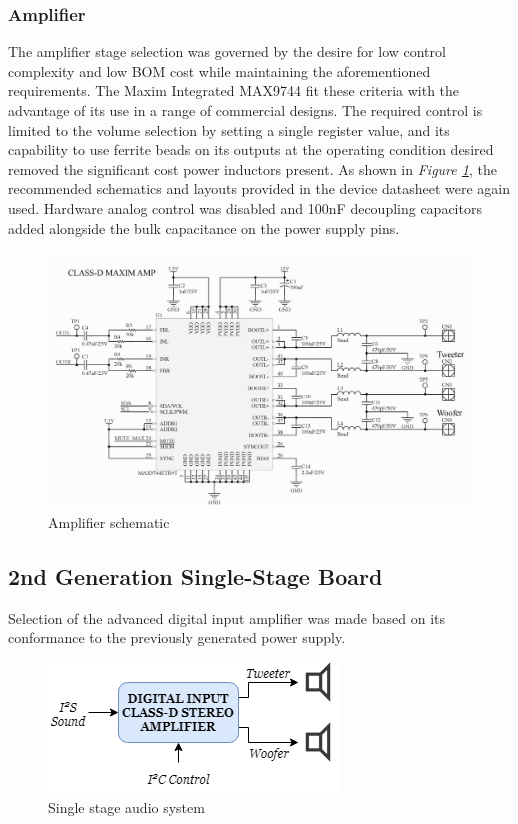 \documentclass[main.tex]{subfiles}
\begin{document}
\subsubsection{Amplifier}
The amplifier stage selection was governed by the desire for low control complexity and low BOM cost while maintaining the aforementioned requirements. The Maxim Integrated MAX9744 fit these criteria with the advantage of its use in a range of commercial designs. The required control is limited to the volume selection by setting a single register value, and its capability to use ferrite beads on its outputs at the operating condition desired removed the significant cost power inductors present. As shown in \textit{Figure \ref{fig:maxim-circuit}}, the recommended schematics and layouts provided in the device datasheet were again used. Hardware analog control was disabled and 100nF decoupling capacitors added alongside the bulk capacitance on the power supply pins.

\begin{figure}[H]
    \centering
    \includegraphics[scale=0.6]{./figs/MAXIM-circuit.PNG}
    \caption{Amplifier schematic}
    \label{fig:maxim-circuit}
\end{figure}

\subsection{2nd Generation Single-Stage Board}

Selection of the advanced digital input amplifier was made based on its conformance to the previously generated power supply. 

\begin{figure}[H]
    \centering
    \includegraphics[scale=0.75]{./figs/TAS-system.png}
    \caption{Single stage audio system}
    \label{fig:tas-system}
\end{figure}
\end{document}
